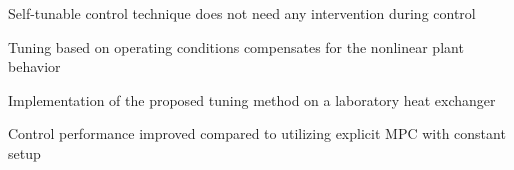 \documentclass[preprint,12pt]{elsarticle}
\begin{document}
\begin{highlights}
	\item Self-tunable control technique does not need any intervention during control
	\item Tuning based on operating conditions compensates for the nonlinear plant behavior
	\item Implementation of the proposed tuning method on a laboratory heat exchanger 
	\item Control performance improved compared to utilizing explicit MPC with constant setup
\end{highlights}
\end{document}
